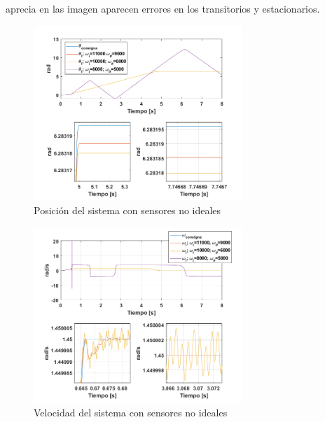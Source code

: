 \documentclass[10pt]{article}
\begin{document}
\begin{itemize}
 aprecia en las imagen aparecen errores en los transitorios y estacionarios.
 \begin{figure}[h!]
	\centering
	\includegraphics[width=0.7\textwidth]{theta_consignas.png}
	\caption{\label{fig:theta_consignas}Posición del sistema con sensores no ideales}
	\end{figure}
 \begin{figure}[h!]
	\centering
	\includegraphics[width=0.7\textwidth]{omega_sensores.png}
	\caption{\label{fig:omega_sensores}Velocidad del sistema con sensores no ideales}
	\end{figure}


\end{itemize}
\end{document}
